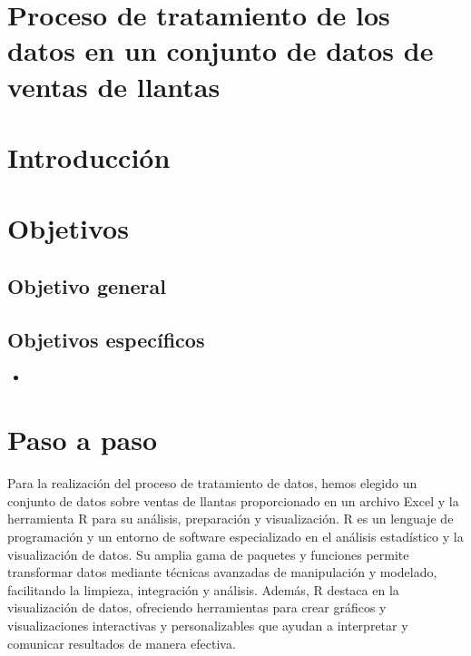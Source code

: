\documentclass[12pt]{article}
\begin{document}
    

    \tableofcontents
    \newpage

    \section*{\centering Proceso de tratamiento de los datos en un conjunto de datos de ventas de llantas}

    \section{Introducción}
                

    \newpage
    \section{Objetivos}
        \subsection{Objetivo general}
                        

        \subsection{Objetivos específicos}
            \begin{itemize}
                \item 
            \end{itemize}


    \newpage
    \section{Paso a paso}
    
        Para la realización del proceso de tratamiento de datos, hemos elegido un conjunto de datos sobre ventas de llantas proporcionado en un archivo Excel y la herramienta R para su análisis, preparación y visualización. R es un lenguaje de programación y un entorno de software especializado en el análisis estadístico y la visualización de datos. Su amplia gama de paquetes y funciones permite transformar datos mediante técnicas avanzadas de manipulación y modelado, facilitando la limpieza, integración y análisis. Además, R destaca en la visualización de datos, ofreciendo herramientas para crear gráficos y visualizaciones interactivas y personalizables que ayudan a interpretar y comunicar resultados de manera efectiva. 
        
\end{document}
